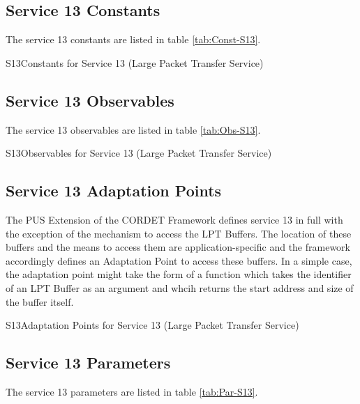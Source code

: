\documentclass{pnp_article}
\begin{document}
\newpage
\subsection{Service 13 Constants}\label{sec:serv13Const}
The service 13 constants are listed in table \ref{tab:Const-S13}. 

\begin{cr_const}{S13}{Constants for Service 13 (Large Packet Transfer Service)}
\end{cr_const}


\subsection{Service 13 Observables}\label{sec:serv13Obs}
The service 13 observables are listed in table \ref{tab:Obs-S13}.

\begin{cr_obs}{S13}{Observables for Service 13 (Large Packet Transfer Service)}
\end{cr_obs}

\newpage
\subsection{Service 13 Adaptation Points}
The PUS Extension of the CORDET Framework defines service 13 in full with the exception of the mechanism to access the LPT Buffers. The location of these buffers and the means to access them are application-specific and the framework accordingly defines an Adaptation Point to access these buffers. In a simple case, the adaptation point might take the form of a function which takes the identifier of an LPT Buffer as an argument and whcih returns the start address and size of the buffer itself.

\begin{cr_ap}{S13}{Adaptation Points for Service 13 (Large Packet Transfer Service)}
\end{cr_ap}


\subsection{Service 13 Parameters}\label{sec:serv13Par}
The service 13 parameters are listed in table \ref{tab:Par-S13}.
\end{document}
